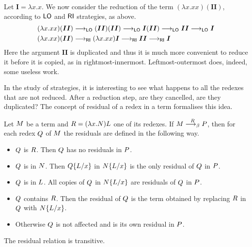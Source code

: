 \begin{example}\label{example:copy}
	Let $\bm{I}=\lambda x.x$. We now consider the reduction of the term
	$(\lambda x.xx)(\bm{II})$, according to $\textsf{LO}$ and $\textsf{RI}$
	strategies, as above.
	\begin{align*}
		(\lambda x.xx)(\bm{II})&\longrightarrow_{\textsf{LO}} (\bm{II})(\bm{II}) \longrightarrow_{\textsf{LO}}
		\bm{I}(\bm{II}) \longrightarrow_{\textsf{LO}} \bm{II} \longrightarrow_{\textsf{LO}} \bm{I}\\
		(\lambda x.xx)(\bm{II})&\longrightarrow_{\textsf{RI}} (\lambda x.xx)\bm{I} \longrightarrow_{\textsf{RI}} \bm{II} \longrightarrow_{\textsf{RI}} \bm{I}
	\end{align*}
	Here the argument $\bm{II}$ is duplicated and thus it is much more convenient
	to reduce it before it is copied, as in
	rightmost-innermost. Leftmost-outermost does, indeed, some useless
	work.
\end{example}
\begin{THESIS}
	In the study of strategies, it is interesting to see what happens to all the redexes that are not reduced. After a reduction step, are they cancelled, are they duplicated? The concept of residual of a redex in a term formalises this idea.
	\begin{definition}
		Let $M$ be a term and $R=(\lambda x.N)L$ one of its redexes. If $M\overset{R}{\longrightarrow_\beta}P$, then for each redex $Q$ of $M$ the residuals are defined in the following way.
		\begin{itemize}
			\item $Q$ is $R$. Then $Q$ has no residuals in $P$.
			\item $Q$ is in $N$. Then $Q\{L/x\}$ in $N\{L/x\}$ is the only residual of $Q$ in $P$.
			\item $Q$ is in $L$. All copies of $Q$ in $N\{L/x\}$ are residuals of $Q$ in $P$.
			\item $Q$ contains $R$. Then the residual of $Q$ is the term obtained by replacing $R$ in $Q$ with $N\{L/x\}$.
			\item Otherwise $Q$ is not affected and is its own residual in $P$.
		\end{itemize}
		The residual relation is transitive.
	\end{definition}

\end{THESIS}
